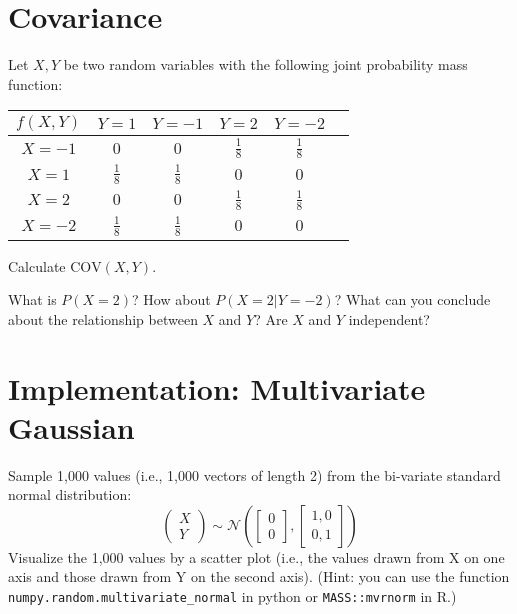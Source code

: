 \documentclass[11pt]{article}
\begin{document}
\ee



\section{Covariance }
Let $X,Y$ be two random variables with the following joint probability mass function:

\begin{center}
\begin{tabular}{|c|c|c|c|c|c}
\hline
 $f(X,Y)$& $Y = 1$ & $Y = -1$ & $Y = 2$ & $Y = -2$\\
\hline
$X = -1$ & $0$ & $0$ & $\frac{1}{8}$ & $\frac{1}{8}$ \\
\hline
$X = 1$ &$\frac{1}{8}$ & $\frac{1}{8}$ & $0$ & $0$\\
\hline
$X = 2$ & $0$ & $0$ & $\frac{1}{8}$ & $\frac{1}{8}$ \\
\hline
$X = -2$ &$\frac{1}{8}$ & $\frac{1}{8}$ & $0$ & $0$\\
\hline
\end{tabular}
\end{center}

\be
\item {} Calculate $\text{COV}(X,Y)$.
\ifnotsolution{\vspace{5cm}}




\item {} What is $P(X = 2)$? How about $P(X = 2\vert Y = -2)$? What can you conclude about the relationship between $X$ and $Y$? Are $X$ and $Y$ independent? 
\ifnotsolution{\clearpage}

\ee



\section{Implementation: Multivariate Gaussian }
\be
\item {} Sample 1,000 values (i.e., 1,000 vectors of length 2) from the bi-variate standard normal distribution:
$$\begin{pmatrix}X \\ Y\end{pmatrix} \sim \mathcal{N} \left(\begin{bmatrix}0 \\ 0\end{bmatrix}, \begin{bmatrix}1,0 \\ 0,1 \end{bmatrix} \right)$$
Visualize the 1,000 values by a scatter plot (i.e., the values drawn from X on one axis and those drawn from Y on the second axis). (Hint: you can use the function \verb|numpy.random.multivariate_normal| in python or \verb|MASS::mvrnorm| in R.)
\ifnotsolution{\vspace{10cm}}
\end{document}
